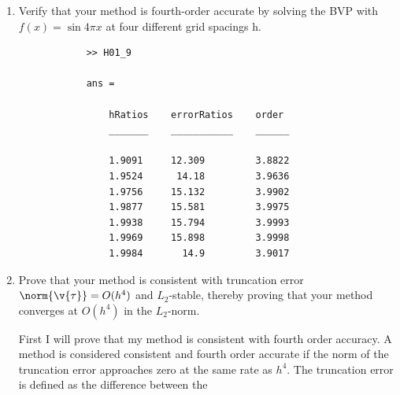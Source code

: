 \documentclass[11pt, oneside]{article}
\begin{document}
\begin{enumerate}
    \item %
        Verify that your method is fourth-order accurate by solving the BVP with
        $f(x) = \sin{4\pi x}$ at four different grid spacings h.

        
        \begin{verbatim}
            >> H01_9

            ans = 

                hRatios    errorRatios    order 
                _______    ___________    ______

                1.9091     12.309         3.8822
                1.9524      14.18         3.9636
                1.9756     15.132         3.9902
                1.9877     15.581         3.9975
                1.9938     15.794         3.9993
                1.9969     15.898         3.9998
                1.9984       14.9         3.9017
        \end{verbatim}

    \item %
        Prove that your method is consistent with truncation error
        $\norm{\v{\tau}} = O(h^4)$ and $L_2$-stable, thereby proving that
        your method converges at $O(h^4)$ in the $L_2$-norm.

        First I will prove that my method is consistent with fourth order
        accuracy.
        A method is considered consistent and fourth order accurate if the
        norm of the truncation error approaches zero at the same rate as $h^4$.
        The truncation error is defined as the difference between the 


\end{enumerate}
\end{document}
